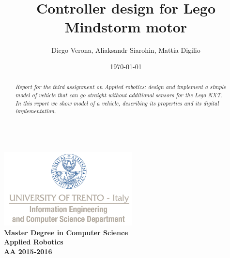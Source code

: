 \documentclass[a4paper,12pt,oneside]{article}
\title{Controller design for Lego Mindstorm motor}
\author{Diego Verona, Aliaksandr Siarohin, Mattia Digilio}
\date{\today}
\begin{document}
\makeatletter  %
\begin{titlepage}
      \centering
      ~~~~~~~~~~~~~\\[-30mm]
      \includegraphics[keepaspectratio=true, width=7cm]{bg_eng_1r.jpg} \\[10mm]

     {
     \large \bfseries Master Degree in Computer Science\\[3mm] 
     Applied Robotics\\[3mm]
     AA 2015-2016
     }\\[10mm]


     \vspace{0.5cm}
     {
     \Large \bfseries \textcolor{blue}{\@title} \par
     }
     \vspace{0.5cm}
     \vspace{0.2cm}

     {\large {\@author}}
     \\ \vspace{.2cm}
     \@date

     \vspace{0.6cm}


\begin{abstract}

\textit{
  Report for the third assignment on Applied robotics: design and implement a simple model of vehicle that can go straight without additional sensors for the Lego NXT.\\In this report we show model of a vehicle, describing its properties and its digital implementation.
}


\end{abstract}

\end{titlepage}
\end{document}
